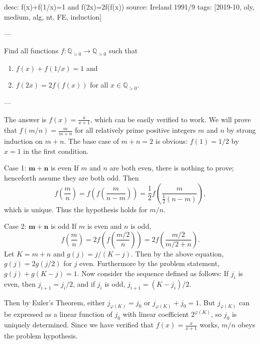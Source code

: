 desc: f(x)+f(1/x)=1 and f(2x)=2f(f(x))
source: Ireland 1991/9
tags: [2019-10, oly, medium, alg, nt, FE, induction]

---

Find all functions $f:\mathbb Q_{>0}\to\mathbb Q_{>0}$ such that
\begin{enumerate}[label=(\roman*),itemsep=0em]
    \item $f(x)+f(1/x)=1$ and
    \item $f(2x)=2f(f(x))$ for all $x\in\mathbb Q_{>0}$.
\end{enumerate}

---

The answer is $f(x)=\frac x{x+1}$, which can be easily verified to work. We will prove that $f(m/n)=\frac m{m+n}$ for all relatively prime positive integers $m$ and $n$ by strong induction on $m+n$. The base case of $m+n=2$ is obvious: $f(1)=1/2$ by $x=1$ in the first condition.
\begin{customenv}{Case 1: $\pmb{m+n}$ is even}
    If $m$ and $n$ are both even, there is nothing to prove; henceforth assume they are both odd. Then \[f\left(\frac mn\right)=f\left(f\left(\frac m{n-m}\right)\right)=\frac12f\left(\frac m{\frac12(n-m)}\right),\]
    which is unique. Thus the hypothesis holds for $m/n$.
\end{customenv}
\begin{customenv}{Case 2: $\pmb{m+n}$ is odd}
    If $m$ is even and $n$ is odd, \[f\left(\frac mn\right)=2f\left(f\left(\frac{m/2}n\right)\right)=2f\left(\frac{m/2}{m/2+n}\right).\]
    Let $K=m+n$ and $g(j)=j/(K-j)$. Then by the above equation, $g(j)=2g(j/2)$ for $j$ even. Furthermore by the problem statement, $g(j)+g(K-j)=1$. Now consider the sequence defined as follows: If $j_i$ is even, then $j_{i+1}=j_i/2$, and if $j_i$ is odd, $j_{i+1}=(K-j_i)/2$.

    Then by Euler's Theorem, either $j_{\varphi(K)}=j_0$ or $j_{\varphi(K)}+j_0=1$. But $j_{\varphi(K)}$ can be expressed as a linear function of $j_0$ with linear coefficient $2^{\varphi(K)}$, so $j_0$ is uniquely determined. Since we have verified that $f(x)=\frac x{x+1}$ works, $m/n$ obeys the problem hypothesis.
\end{customenv}
